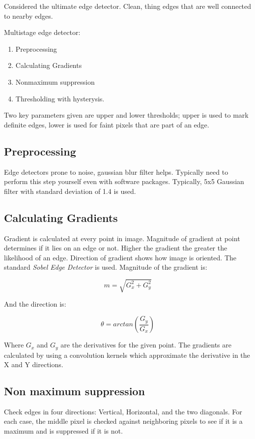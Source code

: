\cite{AIShackCannyEdge} 

Considered the ultimate edge detector. Clean, thing edges that are well connected to nearby edges. 

Multistage edge detector:

\begin{enumerate}
\item Preprocessing
\item Calculating Gradients
\item Nonmaximum suppression
\item Thresholding with hysterysis.
\end{enumerate}

Two key parameters given are upper and lower thresholds; upper is used to mark definite edges, lower is used for faint pixels that are part of an edge.

\subsection{Preprocessing}
Edge detectors prone to noise, gaussian blur filter helps. Typically need to perform this step yourself even with software packages. Typically, 5x5 Gaussian filter with standard deviation of 1.4 is used.

\subsection{Calculating Gradients}

Gradient is calculated at every point in image. Magnitude of gradient at point determines if it lies on an edge or not. Higher the gradient the greater the likelihood of an edge. Direction of gradient shows how image is oriented. The standard \emph{Sobel Edge Detector} is used. Magnitude of the gradient is:

\begin{equation}
m = \sqrt{G_x^2 + G_y^2}
\end{equation}

And the direction is:

\begin{equation}
\theta = arctan(\frac{G_y}{G_x})
\end{equation}

Where $G_x$ and $G_y$ are the derivatives for the given point. The gradients are calculated by using a convolution kernels which approximate the derivative in the X and Y directions.

\subsection{Non maximum suppression}
Check edges in four directions: Vertical, Horizontal, and the two diagonals. For each case, the middle pixel is checked against neighboring pixels to see if it is a maximum and is suppressed if it is not.

